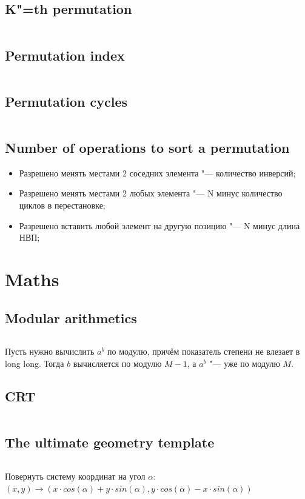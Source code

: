 ﻿\documentclass[a4paper,10pt,twocolumn,oneside]{article}
\begin{document}
\subsection{K"=th permutation}
\inputminted[breaklines]{cpp}{Permutations/k-th permutation.cpp}
\subsection{Permutation index}
\inputminted[breaklines]{python}{Permutations/permutation number.py}
\subsection{Permutation cycles}
\inputminted[breaklines]{cpp}{Permutations/permutation cycles.cpp}
\subsection{Number of operations to sort a permutation}
\begin{itemize}
\item Разрешено менять местами 2 соседних элемента "--- количество инверсий;
\item Разрешено менять местами 2 любых элемента "--- N минус количество циклов в перестановке;
\item Разрешено вставить любой элемент на другую позицию "--- N минус длина НВП;
\end{itemize}

\section{Maths}
\subsection{Modular arithmetics}
\inputminted[breaklines]{cpp}{Maths/modular arithmetics.cpp}
Пусть нужно вычислить $a^b$ по модулю, причём показатель степени не влезает в long long. Тогда $b$ вычисляется по модулю $M - 1$, а $a^b$ "--- уже по модулю $M$.
\subsection{CRT}
\inputminted[breaklines]{python}{Maths/crt.py}
\subsection{The ultimate geometry template}
\inputminted[breaklines]{python}{Maths/geometry.py}
Повернуть систему координат на угол $\alpha$:\\
$(x, y) \rightarrow (x \cdot cos(\alpha) + y \cdot sin(\alpha), y \cdot cos(\alpha) - x \cdot sin(\alpha))$
\end{document}
